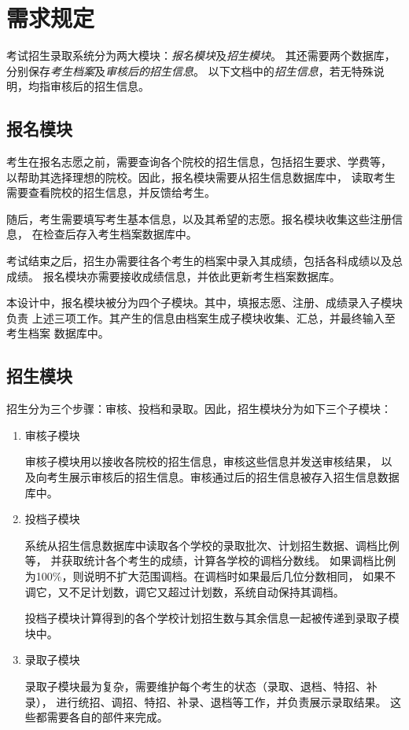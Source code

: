 \documentclass[CJK,utf8]{ctexrep}
\begin{document}
\section*{需求规定}

考试招生录取系统分为两大模块：\emph{报名模块}及\emph{招生模块}。
其还需要两个数据库，分别保存\emph{考生档案}及\emph{审核后的招生信息}。
以下文档中的\emph{招生信息}，若无特殊说明，均指审核后的招生信息。

\subsection*{报名模块}

考生在报名志愿之前，需要查询各个院校的招生信息，包括招生要求、学费等，
以帮助其选择理想的院校。因此，报名模块需要从招生信息数据库中，
读取考生需要查看院校的招生信息，并反馈给考生。

随后，考生需要填写考生基本信息，以及其希望的志愿。报名模块收集这些注册信息，
在检查后存入考生档案数据库中。

考试结束之后，招生办需要往各个考生的档案中录入其成绩，包括各科成绩以及总成绩。
报名模块亦需要接收成绩信息，并依此更新考生档案数据库。

本设计中，报名模块被分为四个子模块。其中，填报志愿、注册、成绩录入子模块负责
上述三项工作。其产生的信息由档案生成子模块收集、汇总，并最终输入至考生档案
数据库中。

\subsection*{招生模块}

招生分为三个步骤：审核、投档和录取。因此，招生模块分为如下三个子模块：

\begin{enumerate}
	\item 审核子模块
	
	审核子模块用以接收各院校的招生信息，审核这些信息并发送审核结果，
	以及向考生展示审核后的招生信息。审核通过后的招生信息被存入招生信息数据库中。
	
	\item 投档子模块
	
	系统从招生信息数据库中读取各个学校的录取批次、计划招生数据、调档比例等，
	并获取统计各个考生的成绩，计算各学校的调档分数线。
	如果调档比例为100\%，则说明不扩大范围调档。在调档时如果最后几位分数相同，
	如果不调它，又不足计划数，调它又超过计划数，系统自动保持其调档。
	
	投档子模块计算得到的各个学校计划招生数与其余信息一起被传递到录取子模块中。
	
	\item 录取子模块
	
	录取子模块最为复杂，需要维护每个考生的状态（录取、退档、特招、补录），
	进行统招、调招、特招、补录、退档等工作，并负责展示录取结果。
	这些都需要各自的部件来完成。
\end{enumerate}
\end{document}
